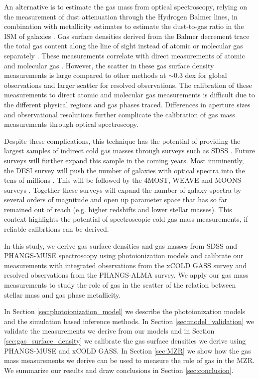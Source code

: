 \documentclass[fleqn,usenatbib]{mnras}
\begin{document}
An alternative is to estimate the gas mass from optical spectroscopy, relying on the measurement of dust attenuation through the Hydrogen Balmer lines, in combination with metallicity estimates to estimate the dust-to-gas ratio in the ISM of galaxies \citep{guver2009, heiderman2010, brinchmann2013}. Gas surface densities derived from the Balmer decrement trace the total gas content along the line of sight instead of atomic or molecular gas separately \citep{concas2019, barrera-ballesteros2020}. These measurements  correlate with direct measurements of atomic and molecular gas \citep{concas2019, yesuf2019, piotrowska2020, barrera-ballesteros2020}. However, the scatter in these gas surface density measurements is large compared to other methods at $\sim$0.3 dex for global observations and larger scatter for resolved observations. The calibration of these measurements to direct atomic and molecular gas measurements is difficult due to the different physical regions and gas phases traced. Differences in aperture sizes and observational resolutions further complicate the calibration of gas mass measurements through optical spectroscopy. 

Despite these complications, this technique has the potential of providing the largest samples of indirect cold gas masses through surveys such as SDSS \citep[][]{abazajian2009, piotrowska2020}. Future surveys will further expand this sample in the coming years. Most imminently, the DESI survey will push the number of galaxies with optical spectra into the tens of millions \citep{desi2022}. This will be followed by the 4MOST, WEAVE and MOONS surveys \citep[][]{driver2019, dalton2012, cirasuolo2020}. Together these surveys will expand the number of galaxy spectra by several orders of magnitude and open up parameter space that has so far remained out of reach (e.g. higher redshifts and lower stellar masses). This context highlights the potential of spectroscopic cold gas mass measurements, if reliable calibrtions can be derived.  

In this study, we derive gas surface densities and gas masses from SDSS and PHANGS-MUSE spectroscopy using photoionization models and calibrate our measurements with integrated observations from the xCOLD GASS survey and resolved observations from the PHANGS-ALMA survey. We apply our gas mass measurements to study the role of gas in the scatter of the relation between stellar mass and gas phase metallicity.

In Section \ref{sec:photoionization_model} we describe the photoionization models and the simulation based inference methods. In Section \ref{sec:model_validation} we validate the measurements we derive from our models and in Section \ref{sec:gas_surface_density} we calibrate the gas surface densities we derive using PHANGS-MUSE and xCOLD GASS. In Section \ref{sec:MZR} we show how the gas mass measurements we derive can be used to measure the role of gas in the MZR. We summarize our results and draw conclusions in Section \ref{sec:conclusion}.
\end{document}

